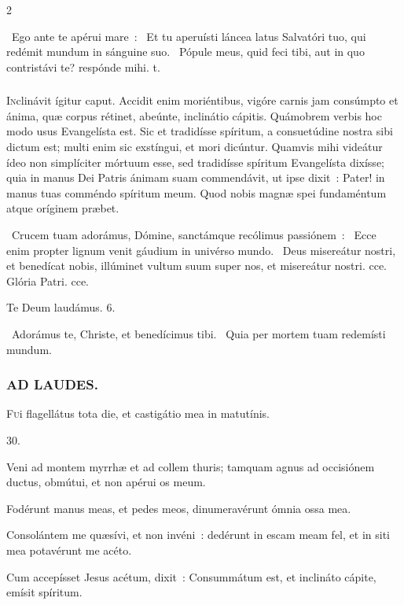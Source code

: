 \documentclass[9pt,twoside]{extarticle}
\begin{document}
\begin{multicols}{2}
{\begin{tightlist}{}
\item {}~Ego ante te apérui mare~: \textred{*}~Et tu aperuísti láncea latus Salvatóri tuo, qui redémit mundum in sánguine suo. ~Pópule meus, quid feci tibi, aut in quo contristávi te? respónde mihi. t.
\end{tightlist}

\subsubsection*{\center{}}
\lettrine{I}nclinávit ígitur caput. Accidit enim moriéntibus, vigóre carnis jam consúmpto et ánima, quæ corpus rétinet, abeúnte, inclinátio cápitis. Quámobrem verbis hoc modo usus Evangelísta est. Sic et tradidísse spíritum, a consuetúdine nostra sibi dictum est; multi enim sic exstíngui, et mori dicúntur. Quamvis mihi videátur ídeo non simplíciter mórtuum esse, sed tradidísse spíritum Evangelísta dixísse; quia in manus Dei Patris ánimam suam commendávit, ut ipse dixit~: Pater! in manus tuas comméndo spíritum meum. Quod nobis magnæ spei fundaméntum atque oríginem præbet.

\begin{tightlist}{}
\item {}~Crucem tuam adorámus, Dómine, sanctámque recólimus passiónem~: \textred{*}~Ecce enim propter lignum venit gáudium in univérso mundo. ~Deus misereátur nostri, et benedícat nobis, illúminet vultum suum super nos, et misereátur nostri. cce. Glória Patri. cce.
\item Te Deum laudámus. 6.
\item {}~Adorámus te, Christe, et benedícimus tibi. ~Quia per mortem tuam redemísti mundum.
\end{tightlist}

\subsubsection*{\center \textsc{AD LAUDES.}}
\begin{center}\end{center}
\lettrine{F}ui flagellátus tota die, et castigátio mea in matutínis.

\begin{tightlist}{}
\item {} 30. 
\item {} Veni ad montem myrrhæ et ad collem thuris; tamquam agnus ad occisiónem ductus, obmútui, et non apérui os meum.
\item {} Fodérunt manus meas, et pedes meos, dinumeravérunt ómnia ossa mea.
\item {} Consolántem me quæsívi, et non invéni~: dedérunt in escam meam fel, et in siti mea potavérunt me acéto.
\item {} Cum accepísset Jesus acétum, dixit~: Consummátum est, et inclináto cápite, emísit spíritum.
\end{tightlist}

}
\end{multicols}
\end{document}
